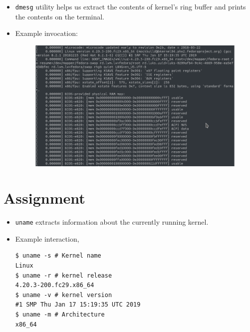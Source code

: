 \documentclass{beamer}
\begin{document}
\begin{frame}
  \begin{itemize}
  \item \texttt{dmesg} utility helps us extract the contents of kernel's ring
    buffer and prints the contents on the terminal.
  \item Example invocation:
    \begin{figure}[h!]
      \centering
      \includegraphics[scale=0.3]{images/dmesg-0.png}
    \end{figure}
  \end{itemize}
\end{frame}

\section{Assignment}
\begin{frame}[fragile]
  \begin{itemize}
  \item \texttt{uname} extracts information about the currently running
    kernel.
  \item Example interaction,
\begin{lstlisting}
$ uname -s # Kernel name
Linux
$ uname -r # kernel release
4.20.3-200.fc29.x86_64
$ uname -v # kernel version
#1 SMP Thu Jan 17 15:19:35 UTC 2019
$ uname -m # Architecture
x86_64
\end{lstlisting}
  \end{itemize}
\end{frame}
\end{document}
